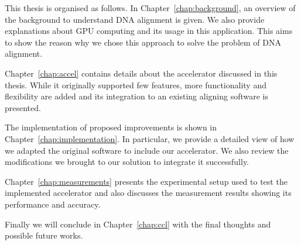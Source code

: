 This thesis is organised as follows.
In Chapter~\ref{chap:background}, an overview of the background to understand DNA alignment is given. We also provide explanations about GPU computing and its usage in this application. This aims to show the reason why we chose this approach to solve the problem of DNA alignment.

Chapter~\ref{chap:accel} contains details about the accelerator discussed in this thesis. While it originally supported few features, more functionality and flexibility are added and its integration to an existing aligning software is presented.

The implementation of proposed improvements is shown in Chapter~\ref{chap:implementation}. In particular, we provide a detailed view of how we adapted the original software to include our accelerator. We also review the modifications we brought to our solution to integrate it successfully.

Chapter~\ref{chap:measurements} presents the experimental setup used to test the implemented accelerator and also discusses the measurement results showing its performance and accuracy.

Finally we will conclude in Chapter~\ref{chap:ccl} with the final thoughts and possible future works.